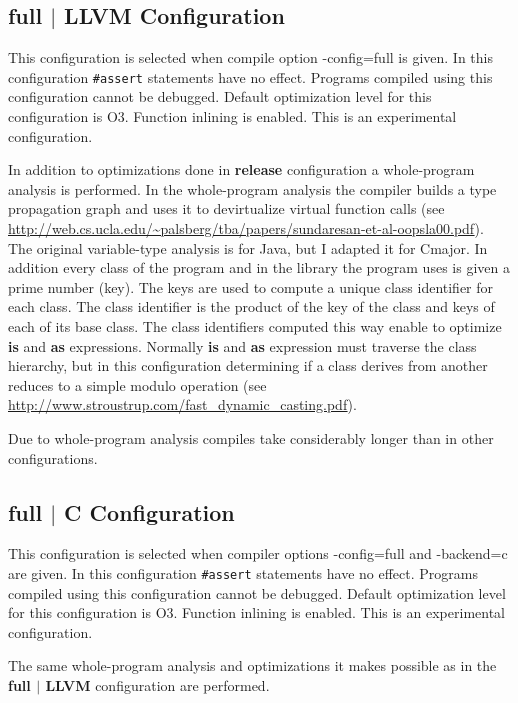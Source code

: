 \documentclass[oneside, a4paper, 11pt]{article}
\begin{document}
\subsection{full $|$ LLVM Configuration}

This configuration is selected when compile option -config=full is given. In this configuration \verb|#assert| statements have no effect.
Programs compiled using this configuration cannot be debugged. Default optimization level for this configuration is O3. Function inlining is enabled.
This is an experimental configuration.

In addition to optimizations done in \textbf{release} configuration a whole-program analysis is performed.
In the whole-program analysis the compiler builds a type propagation graph and uses it to devirtualize
virtual function calls (see \url{http://web.cs.ucla.edu/~palsberg/tba/papers/sundaresan-et-al-oopsla00.pdf}).
The original variable-type analysis is for Java, but I adapted it for Cmajor.
In addition every class of the program and in the library the program uses is given a prime number (key). The keys are used to compute a unique class identifier
for each class. The class identifier is the product of the key of the class and keys of each of its base class.
The class identifiers computed this way enable to optimize \textbf{is} and \textbf{as} expressions.
Normally \textbf{is} and \textbf{as} expression must traverse the class hierarchy,
but in this configuration determining if a class derives from another reduces to a simple modulo operation
(see \url{http://www.stroustrup.com/fast_dynamic_casting.pdf}).

Due to whole-program analysis compiles take considerably longer than in other configurations.

\subsection{full $|$ C Configuration}

This configuration is selected when compiler options -config=full and -backend=c are given. In this configuration \verb|#assert| statements have no effect.
Programs compiled using this configuration cannot be debugged. Default optimization level for this configuration is O3. Function inlining is enabled.
This is an experimental configuration.

The same whole-program analysis and optimizations it makes possible as in the \textbf{full $|$ LLVM} configuration are performed.
\end{document}

